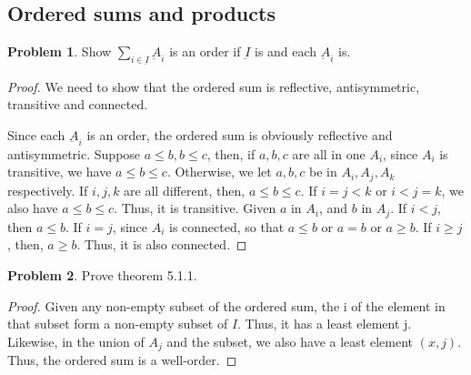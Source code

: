 \documentclass[a4paper,11pt]{article}%
\theoremstyle{remark}
\theoremstyle{definition}
\newtheorem{problem}{Problem}[subsection]
\begin{document}
\subsection{Ordered sums and products}
\begin{problem}
    Show $\sum_{i\in \underbar{I}}\underbar{A}_i$ is an order if $\underbar{I}$ is and each $\underbar{A}_i$ is.
    \begin{proof}
        We need to show that the ordered sum is reflective, antisymmetric, transitive and connected.

        Since each $\underbar{A}_i$ is an order, the ordered sum is obviously reflective and antisymmetric.
        Suppose $a\leq b,b\leq c$, then, if $a,b,c$ are all in one $A_i$, since $A_i$ is 
        transitive, we have $a\leq b\leq c$. Otherwise, we let $a,b,c$ be in $A_i,A_j,A_k$ 
        respectively. If $i,j,k$ are all different, then, $a\leq b\leq c$.
        If $i=j<k$ or $i<j=k$, we also have $a\leq b\leq c$. Thus, it is transitive.
        Given $a$ in $A_i$, and $b$ in $A_j$. If $i<j$, then $a\leq b$.
        If $i=j$, since $A_i$ is connected, so that $a\leq b$ or $a=b$ or $a\geq b$.
        If $i\geq j$, then, $a\geq b$. Thus, it is also connected.
    \end{proof}
\end{problem}
\begin{problem}
    Prove theorem 5.1.1.
    \begin{proof}
        Given any non-empty subset of the ordered sum, the i of the element in that subset
        form a non-empty subset of $I$. Thus, it has a least element j. Likewise, in the union of $A_j$ and
        the subset, we also have a least element $(x,j)$. Thus, the ordered sum is a well-order.
    \end{proof}
\end{problem}
\end{document}
